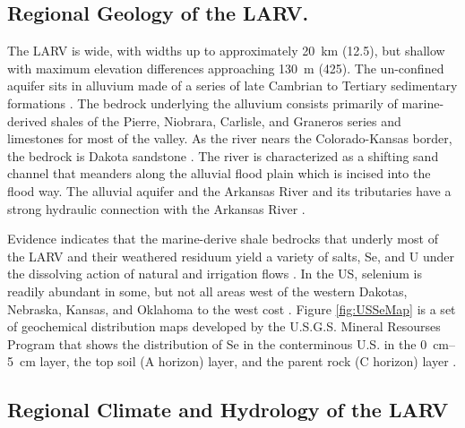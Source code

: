 \subsection*{Regional Geology of the LARV.}
The LARV is wide, with widths up to approximately \SI{20}{\kilo\meter} (\SI{12.5}{\mile}), but shallow with maximum elevation differences approaching \SI{130}{\meter} (\SI{425}{\foot}).  The un-confined aquifer sits in alluvium made of a series of late Cambrian to Tertiary sedimentary formations \parencite{darton1906}.  The bedrock underlying the alluvium consists primarily of marine-derived shales of the Pierre, Niobrara, Carlisle, and Graneros series and limestones for most of the valley.  As the river nears the Colorado-Kansas border, the bedrock is Dakota sandstone \parencite{moore1967} .  The river is characterized as a shifting sand channel that meanders along the alluvial flood plain which is incised into the flood way.  The alluvial aquifer and the Arkansas River and its tributaries have a strong hydraulic connection with the Arkansas River \parencite{konikow1974}.

Evidence indicates that the marine-derive shale bedrocks that underly most of the LARV and their weathered residuum yield a variety of salts, Se, and U under the dissolving action of natural and irrigation flows \parencite{zielinski1995,zielinski1997,gates2009,Bailey2012}.  In the US, selenium is readily abundant in some, but not all areas west of the western Dakotas, Nebraska, Kansas, and Oklahoma to the west cost \parencite{Painter1940}.  Figure \ref{fig:USSeMap} is a set of geochemical distribution maps developed by the U.S.G.S. Mineral Resourses Program that shows the distribution of Se in the conterminous U.S. in the \SIrange{0}{5}{\centi\meter} layer, the top soil (A horizon) layer, and the parent rock (C horizon) layer \parencite{2014Smith}.


\subsection*{Regional Climate and Hydrology of the LARV}

